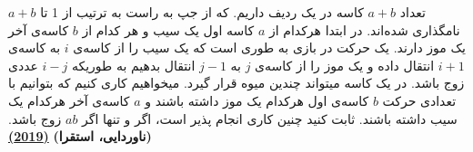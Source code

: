 تعداد $a + b$ کاسه در یک ردیف داریم. که از جپ به راست به ترتیب از 1 تا $a + b$ نامگذاری شده‌اند.
در ابتدا هرکدام از $a$ کاسه اول یک سیب و هر کدام از $b$ کاسه‌ی آخر یک موز دارند.
یک حرکت در بازی به طوری است که یک سیب را از کاسه‌ی $i$ به کاسه‌ی $i + 1$ انتقال داده و یک موز را 
از کاسه‌ی $j$ به $j - 1$ انتقال بدهیم به طوریکه $i - j$ عددی زوج باشد.
در یک کاسه میتواند چندین میوه قرار گیرد.
میخواهیم کاری کنیم که بتوانیم با تعدادی حرکت $b$ کاسه‌ی اول هرکدام یک موز داشته باشند و $a$ 
کاسه‌ی آخر هرکدام یک سیب داشته باشند.
ثابت کنید چنین کاری انجام پذیر است، اگر و تنها اگر $ab$ زوج باشد.
\textbf{(ناوردایی، استقرا)}
\href{https://artofproblemsolving.com/community/c5h1823554p12189456}{\textbf{(2019)}}
